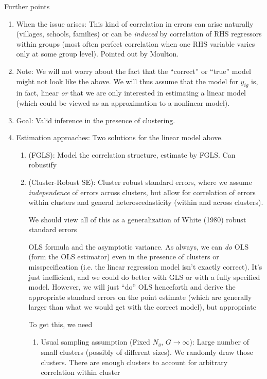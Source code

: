 \documentclass[12pt]{article}
\theoremstyle{plain}
\theoremstyle{definition}
\theoremstyle{remark}
\newcommand{\ra}{\rightarrow}
\begin{document}
Further points
\begin{enumerate}
  \item When the issue arises:
    This kind of correlation in errors can arise naturally (villages,
    schools, families) or can be \emph{induced} by correlation of RHS
    regressors within groups (most often perfect correlation when one
    RHS variable varies only at some group level).
    Pointed out by Moulton.

  \item
    Note: We will not worry about the fact that the ``correct'' or
    ``true'' model might not look like the above.
    We will thus assume that the model for $y_{ig}$ is, in fact, linear
    \emph{or} that we are only interested in estimating a linear
    model (which could be viewed as an approximation to a nonlinear
    model).

  \item
    Goal: Valid inference in the presence of clustering.

  \item
    Estimation approaches:
    Two solutions for the linear model above.
    \begin{enumerate}
      \item (FGLS):
        Model the correlation structure, estimate by FGLS.
        Can robustify

      \item (Cluster-Robust SE):
        Cluster robust standard errors, where we assume \emph{independence}
        of errors across clusters, but allow for correlation of errors
        within clusters and general heteroscedasticity (within and across
        clusters).

        We should view all of this as a generalization of White (1980)
        robust standard errors

        OLS formula and the asymptotic variance.
        As always, we can \emph{do} OLS (form the OLS estimator) even in the
        presence of clusters or misspecification (i.e. the linear regression
        model isn't exactly correct).
        It's just inefficient, and we could do better with GLS or with a
        fully specified model.
        However, we will just ``do'' OLS henceforth and derive the
        appropriate standard errors on the point estimate (which are
        generally larger than what we would get with the correct model), but
        appropriate

        To get this, we need
        \begin{enumerate}
          \item Usual sampling assumption (Fixed $N_g$, $G\ra\infty$):
            Large number of small clusters (possibly of different sizes).
            We randomly draw those clusters.
            There are enough clusters to account for arbitrary correlation
            within cluster


\end{enumerate}
\end{enumerate}
\end{enumerate}
\end{document}
